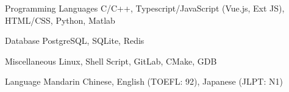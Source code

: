 

\begin{cvskills}

  \cvskill
    {Programming Languages} %
    {C/C++, Typescript/JavaScript (Vue.js, Ext JS), HTML/CSS, Python, Matlab} %

  \cvskill
    {Database} %
    {PostgreSQL, SQLite, Redis} %

  \cvskill
    {Miscellaneous} %
    {Linux, Shell Script, GitLab, CMake, GDB} %

  \cvskill
    {Language} %
    {Mandarin Chinese, English (TOEFL: 92), Japanese (JLPT: N1)} %
\end{cvskills}

